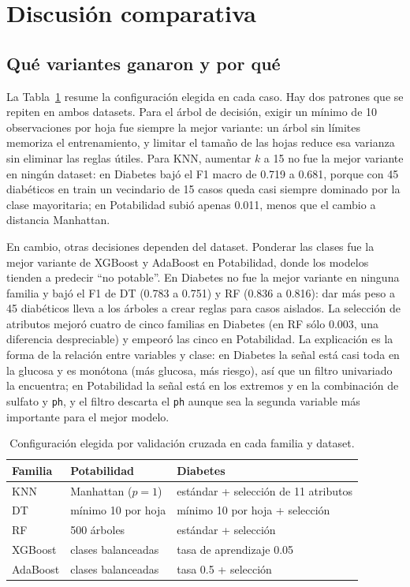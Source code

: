 \section{Discusión comparativa}

\subsection{Qué variantes ganaron y por qué}
La Tabla~\ref{tab:variantes} resume la configuración elegida en cada caso. Hay dos
patrones que se repiten en ambos datasets. Para el árbol de decisión, exigir un mínimo
de 10 observaciones por hoja fue siempre la mejor variante: un árbol sin límites
memoriza el entrenamiento, y limitar el tamaño de las hojas reduce esa varianza sin
eliminar las reglas útiles. Para KNN, aumentar $k$ a 15 no fue la mejor variante en
ningún dataset: en Diabetes bajó el F1 macro de 0.719 a 0.681, porque con 45 diabéticos
en train un vecindario de 15 casos queda casi siempre dominado por la clase mayoritaria;
en Potabilidad subió apenas 0.011, menos que el cambio a distancia Manhattan.

En cambio, otras decisiones dependen del dataset. Ponderar las clases fue la mejor
variante de XGBoost y AdaBoost en Potabilidad, donde los modelos tienden a predecir
``no potable''. En Diabetes no fue la mejor variante en ninguna familia y bajó el F1 de
DT (0.783 a 0.751) y RF (0.836 a 0.816): dar más peso a 45 diabéticos lleva a los
árboles a crear reglas para casos aislados. La selección de atributos mejoró cuatro
de cinco familias en Diabetes (en RF sólo 0.003, una diferencia despreciable) y empeoró las cinco en Potabilidad. La explicación es la
forma de la relación entre variables y clase: en Diabetes la señal está casi toda en la
glucosa y es monótona (más glucosa, más riesgo), así que un filtro univariado la
encuentra; en Potabilidad la señal está en los extremos y en la combinación de sulfato
y \texttt{ph}, y el filtro descarta el \texttt{ph} aunque sea la segunda variable más
importante para el mejor modelo.

\begin{table}[H]\centering\small
\caption{Configuración elegida por validación cruzada en cada familia y dataset.}
\label{tab:variantes}
\begin{tabular}{lll}\toprule
Familia & Potabilidad & Diabetes \\ \midrule
KNN & Manhattan ($p=1$) & estándar + selección de 11 atributos \\
DT & mínimo 10 por hoja & mínimo 10 por hoja + selección \\
RF & 500 árboles & estándar + selección \\
XGBoost & clases balanceadas & tasa de aprendizaje 0.05 \\
AdaBoost & clases balanceadas & tasa 0.5 + selección \\ \bottomrule
\end{tabular}
\end{table}

